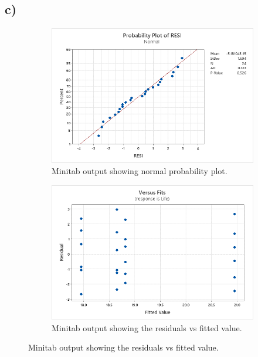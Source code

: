 \documentclass{article}
\begin{document}
\subsection*{c)}
\begin{figure}[h]
    \centering
    \begin{subfigure}[b]{0.4\textwidth}
        \includegraphics[width=1.25\textwidth]{./images/4_c_1.png}
        \caption{Minitab output showing normal probability plot.}
      \label{fig:img1}
    \end{subfigure}
    \hfill
    \begin{subfigure}[b]{0.4\textwidth}
        \includegraphics[width=1.25\textwidth]{./images/4_c_2.png}
        \caption{Minitab output showing the residuals vs fitted value.}
      \label{fig:img2}
    \end{subfigure}
    \label{fig:both}
\end{figure}
\end{document}
